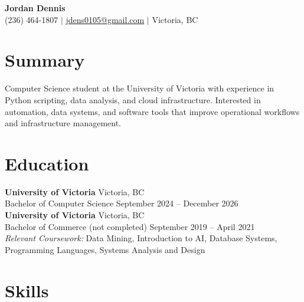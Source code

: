 \documentclass[11pt, letterpaper]{article}
\begin{document}
\begin{center}
    {\LARGE \textbf{Jordan Dennis}} \\[4pt]
    (236) 464-1807 $|$ \href{mailto:jdens0105@gmail.com}{jdens0105@gmail.com} $|$ Victoria, BC
\end{center}

\section{Summary}

Computer Science student at the University of Victoria with experience in Python scripting, data
analysis, and cloud infrastructure. Interested in automation, data systems, and software tools
that improve operational workflows and infrastructure management.

\section{Education}

\textbf{University of Victoria} \hfill Victoria, BC \\
Bachelor of Computer Science \hfill September 2024 -- December 2026 \\[2pt]
\textbf{University of Victoria} \hfill Victoria, BC \\
Bachelor of Commerce (not completed) \hfill September 2019 -- April 2021 \\[4pt]
\textit{Relevant Coursework:} Data Mining, Introduction to AI, Database Systems,
Programming Languages, Systems Analysis and Design

\section{Skills}
\end{document}

